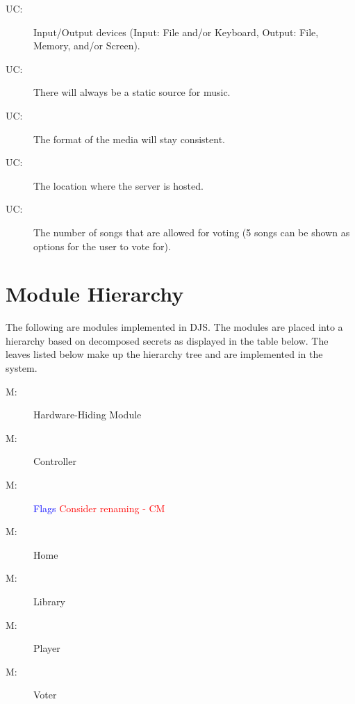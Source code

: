 \documentclass[12pt, titlepage]{article}
\newcounter{ucnum}
\newcommand{\uctheucnum}{UC\theucnum}
\newcounter{mnum}
\newcommand{\mthemnum}{M\themnum}
\begin{document}
\begin{description}
\item[ \uctheucnum \label{ucIO}:] Input/Output devices
 (Input: File and/or Keyboard, Output: File, Memory, and/or Screen).
\item[ \uctheucnum \label{ucInput}:] There will always be a static source for music.
\item[ \uctheucnum \label{ucInput}:] The format of the media will stay consistent.
\item[ \uctheucnum \label{ucInput}:] The location where the server is hosted.
\item[ \uctheucnum \label{ucInput}:] The number of songs that are allowed for voting (5 songs can be shown as options for the user to vote for).
\end{description}


\section{Module Hierarchy} \label{SecMH}
The following are modules implemented in DJS. The modules are placed into a hierarchy based on decomposed secrets as displayed in the table below. The leaves listed below make up the hierarchy tree and are implemented in the system.


\begin{description}
\item [ \mthemnum \label{mHH}:] Hardware-Hiding Module
\item [ \mthemnum \label{mSR}:] Controller
\item [ \mthemnum \label{mAS}:] \textcolor{blue}{Flags} \textcolor{red}{Consider renaming - CM}
\item [ \mthemnum \label{mDO}:] Home
\item [ \mthemnum \label{mLM}:] Library
\item [ \mthemnum \label{mPM}:] Player
\item [ \mthemnum \label{mIV}:] Voter

\end{description}
\end{document}
